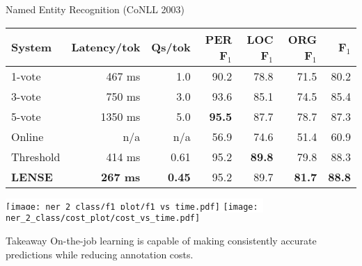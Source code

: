 
\begin{block}{Named Entity Recognition (CoNLL 2003)}
\begin{table}[t]
  {\small
\begin{tabular}{l r r r r r r }
      \textbf{System} & \textbf{Latency/tok} & \textbf{Qs/tok} & \textbf{PER F$_1$} & \textbf{LOC F$_1$} & \textbf{ORG F$_1$} & \textbf{F$_1$}
    \\ \hline
    1-vote & 467 ms & 1.0 & 90.2 & 78.8 & 71.5 & 80.2
      \\ %
    3-vote & 750 ms & 3.0 & 93.6 & 85.1 & 74.5 & 85.4
        \\ %
    5-vote & 1350 ms & 5.0 & \textbf{95.5} & 87.7 & 78.7 & 87.3 
        \\ \hline
    Online & n/a & n/a & 56.9 & 74.6 & 51.4 & 60.9
        \\    %
    Threshold & 414 ms & 0.61 & 95.2 & \textbf{89.8} & 79.8 & 88.3
        \\ %
    \textbf{LENSE} & \textbf{267 ms} & \textbf{0.45} & 95.2 & 89.7 & \textbf{81.7} & \textbf{88.8} 
\end{tabular}
}
\label{tbl:results}
\end{table}

  \begin{center}
    \colorbox{white}{
    \texttt{[image: ner\_2\_class/f1\_plot/f1\_vs\_time.pdf]}
    }
    \colorbox{white}{
    \texttt{[image: ner\_2\_class/cost\_plot/cost\_vs\_time.pdf]}
    }
  \end{center}

  \begin{exampleblock}{Takeaway}
      On-the-job learning is capable of making consistently accurate predictions while reducing annotation costs.
  \end{exampleblock}
\end{block}
\vfill

